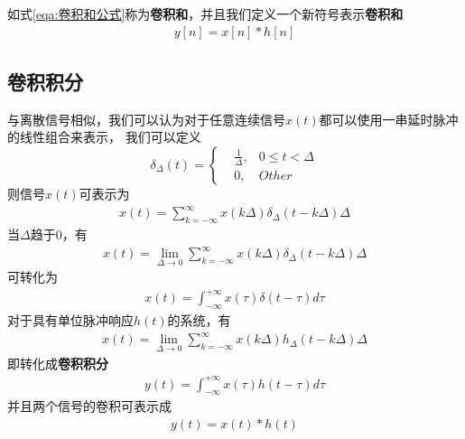 如式\ref{eqa:卷积和公式}称为\textbf{卷积和}，并且我们定义一个新符号表示\textbf{卷积和}
\begin{equation}
    \begin{aligned}
        y[n] = x[n]*h[n]
    \end{aligned}
    \label{eqa:卷积和符号}
\end{equation}

\subsection{卷积积分}

与离散信号相似，我们可以认为对于任意连续信号$x(t)$都可以使用一串延时脉冲的线性组合来表示，
我们可以定义
\begin{equation}
    \delta_{\Delta}(t) = 
    \left\{
    \begin{aligned}
        &\frac{1}{\Delta},&0 \leqslant  t < \Delta\\
        &0,&Other
    \end{aligned}
    \right.
    \label{eqa:卷积积分脉冲}
\end{equation}
则信号$x(t)$可表示为
\begin{equation}
    \begin{aligned}
        x(t) = \sum_{k=-\infty}^{\infty}x(k\Delta)\delta_{\Delta}(t-k\Delta)\Delta
    \end{aligned}
    \label{eqa:卷积积分1}
\end{equation}
当$\Delta $趋于$0$，有
\begin{equation}
    \begin{aligned}
        x(t) = \lim_{\Delta\to0}\sum_{k=-\infty}^{\infty}x(k\Delta)\delta_{\Delta}(t-k\Delta)\Delta
    \end{aligned}
    \label{eqa:卷积积分2}
\end{equation}
可转化为
\begin{equation}
    \begin{aligned}
        x(t) = \int_{-\infty}^{+\infty}x(\tau)\delta(t-\tau)d\tau
    \end{aligned}
    \label{eqa:卷积积分筛选性质}
\end{equation}
对于具有单位脉冲响应$h(t)$的系统，有
\begin{equation}
    \begin{aligned}
        x(t) = \lim_{\Delta\to0}\sum_{k=-\infty}^{\infty}x(k\Delta)h_{\Delta}(t-k\Delta)\Delta
    \end{aligned}
    \label{eqa:卷积积分3}
\end{equation}
即转化成\textbf{卷积积分}
\begin{equation}
    \begin{aligned}
        y(t) = \int_{-\infty}^{+\infty}x(\tau)h(t-\tau)d\tau
    \end{aligned}
    \label{eqa:卷积积分公式}
\end{equation}
并且两个信号的卷积可表示成
\begin{equation}
    \begin{aligned}
        y(t) = x(t)*h(t)
    \end{aligned}
    \label{eqa:卷积积分符号}
\end{equation}

